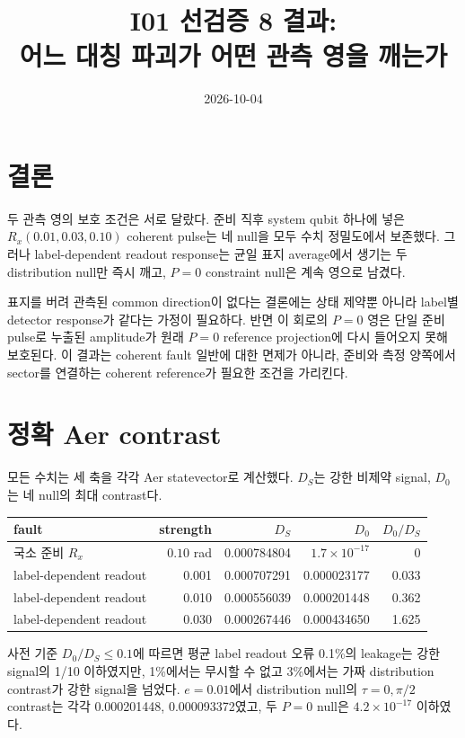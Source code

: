\documentclass[11pt]{article}
\begin{document}
\title{I01 선검증 8 결과:\\
어느 대칭 파괴가 어떤 관측 영을 깨는가}
\date{2026-10-04}
\maketitle

\section*{결론}
두 관측 영의 보호 조건은 서로 달랐다. 준비 직후 system qubit 하나에 넣은
$R_x(0.01,0.03,0.10)$ coherent pulse는 네 null을 모두 수치 정밀도에서
보존했다. 그러나 label-dependent readout response는 균일 표지 average에서
생기는 두 distribution null만 즉시 깨고, $P=0$ constraint null은 계속 영으로
남겼다.

표지를 버려 관측된 common direction이 없다는 결론에는 상태 제약뿐 아니라
label별 detector response가 같다는 가정이 필요하다. 반면 이 회로의 $P=0$ 영은
단일 준비 pulse로 누출된 amplitude가 원래 $P=0$ reference projection에 다시
들어오지 못해 보호된다. 이 결과는 coherent fault 일반에 대한 면제가 아니라,
준비와 측정 양쪽에서 sector를 연결하는 coherent reference가 필요한 조건을
가리킨다.

\section*{정확 Aer contrast}
모든 수치는 세 축을 각각 Aer statevector로 계산했다. $D_S$는 강한 비제약
signal, $D_0$는 네 null의 최대 contrast다.

\begin{center}
\begin{tabular}{lrrrr}
\toprule
fault & strength & $D_S$ & $D_0$ & $D_0/D_S$\\
\midrule
국소 준비 $R_x$ & $0.10$ rad & 0.000784804 & $1.7\times10^{-17}$ & $0$\\
label-dependent readout & 0.001 & 0.000707291 & 0.000023177 & 0.033\\
label-dependent readout & 0.010 & 0.000556039 & 0.000201448 & 0.362\\
label-dependent readout & 0.030 & 0.000267446 & 0.000434650 & 1.625\\
\bottomrule
\end{tabular}
\end{center}

사전 기준 $D_0/D_S\le0.1$에 따르면 평균 label readout 오류 0.1\%의 leakage는
강한 signal의 1/10 이하였지만, 1\%에서는 무시할 수 없고 3\%에서는 가짜
distribution contrast가 강한 signal을 넘었다. $e=0.01$에서 distribution null의
$\tau=0,\pi/2$ contrast는 각각 0.000201448, 0.000093372였고, 두 $P=0$
null은 $4.2\times10^{-17}$ 이하였다.
\end{document}
